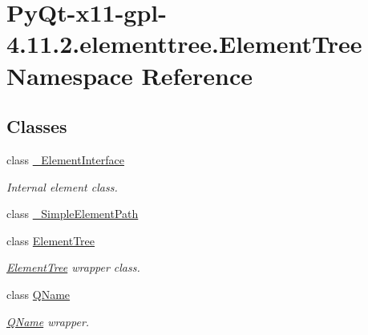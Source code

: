 \hypertarget{namespacePyQt-x11-gpl-4_811_82_1_1elementtree_1_1ElementTree}{}\section{Py\+Qt-\/x11-\/gpl-\/4.11.2.elementtree.\+Element\+Tree Namespace Reference}
\label{namespacePyQt-x11-gpl-4_811_82_1_1elementtree_1_1ElementTree}
\subsection*{Classes}
\begin{DoxyCompactItemize}
\item 
class \hyperlink{classPyQt-x11-gpl-4_811_82_1_1elementtree_1_1ElementTree_1_1__ElementInterface}{\+\_\+\+Element\+Interface}
\begin{DoxyCompactList}\small\item\em Internal element class. \end{DoxyCompactList}\item 
class \hyperlink{classPyQt-x11-gpl-4_811_82_1_1elementtree_1_1ElementTree_1_1__SimpleElementPath}{\+\_\+\+Simple\+Element\+Path}
\item 
class \hyperlink{classPyQt-x11-gpl-4_811_82_1_1elementtree_1_1ElementTree_1_1ElementTree}{Element\+Tree}
\begin{DoxyCompactList}\small\item\em \hyperlink{classPyQt-x11-gpl-4_811_82_1_1elementtree_1_1ElementTree_1_1ElementTree}{Element\+Tree} wrapper class. \end{DoxyCompactList}\item 
class \hyperlink{classPyQt-x11-gpl-4_811_82_1_1elementtree_1_1ElementTree_1_1QName}{Q\+Name}
\begin{DoxyCompactList}\small\item\em \hyperlink{classPyQt-x11-gpl-4_811_82_1_1elementtree_1_1ElementTree_1_1QName}{Q\+Name} wrapper. \end{DoxyCompactList}\end{DoxyCompactItemize}
